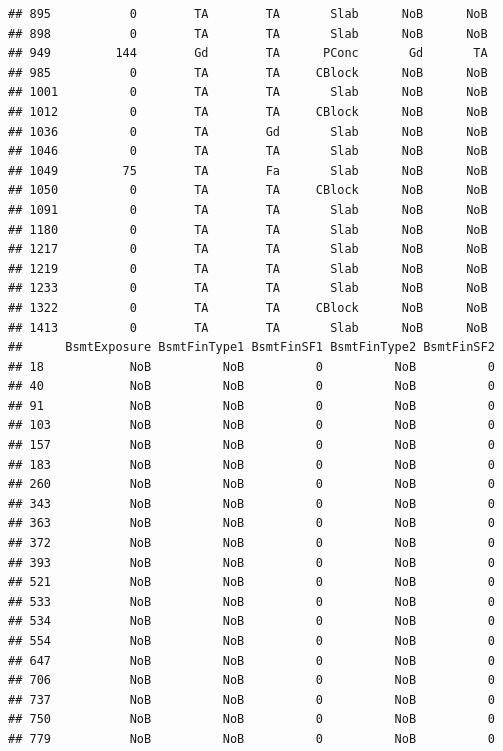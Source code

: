 \documentclass[]{article}
\begin{document}
\begin{verbatim}
## 895           0        TA        TA       Slab      NoB      NoB
## 898           0        TA        TA       Slab      NoB      NoB
## 949         144        Gd        TA      PConc       Gd       TA
## 985           0        TA        TA     CBlock      NoB      NoB
## 1001          0        TA        TA       Slab      NoB      NoB
## 1012          0        TA        TA     CBlock      NoB      NoB
## 1036          0        TA        Gd       Slab      NoB      NoB
## 1046          0        TA        TA       Slab      NoB      NoB
## 1049         75        TA        Fa       Slab      NoB      NoB
## 1050          0        TA        TA     CBlock      NoB      NoB
## 1091          0        TA        TA       Slab      NoB      NoB
## 1180          0        TA        TA       Slab      NoB      NoB
## 1217          0        TA        TA       Slab      NoB      NoB
## 1219          0        TA        TA       Slab      NoB      NoB
## 1233          0        TA        TA       Slab      NoB      NoB
## 1322          0        TA        TA     CBlock      NoB      NoB
## 1413          0        TA        TA       Slab      NoB      NoB
##      BsmtExposure BsmtFinType1 BsmtFinSF1 BsmtFinType2 BsmtFinSF2
## 18            NoB          NoB          0          NoB          0
## 40            NoB          NoB          0          NoB          0
## 91            NoB          NoB          0          NoB          0
## 103           NoB          NoB          0          NoB          0
## 157           NoB          NoB          0          NoB          0
## 183           NoB          NoB          0          NoB          0
## 260           NoB          NoB          0          NoB          0
## 343           NoB          NoB          0          NoB          0
## 363           NoB          NoB          0          NoB          0
## 372           NoB          NoB          0          NoB          0
## 393           NoB          NoB          0          NoB          0
## 521           NoB          NoB          0          NoB          0
## 533           NoB          NoB          0          NoB          0
## 534           NoB          NoB          0          NoB          0
## 554           NoB          NoB          0          NoB          0
## 647           NoB          NoB          0          NoB          0
## 706           NoB          NoB          0          NoB          0
## 737           NoB          NoB          0          NoB          0
## 750           NoB          NoB          0          NoB          0
## 779           NoB          NoB          0          NoB          0

\end{verbatim}
\end{document}
